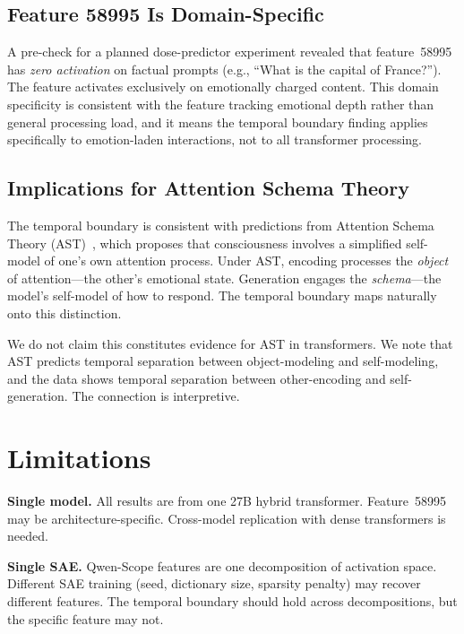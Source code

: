 \documentclass[11pt,a4paper]{article}
\begin{document}
\subsection{Feature 58995 Is Domain-Specific}

A pre-check for a planned dose-predictor experiment revealed that
feature~58995 has \emph{zero activation} on factual prompts (e.g., ``What
is the capital of France?''). The feature activates exclusively on
emotionally charged content. This domain specificity is consistent with
the feature tracking emotional depth rather than general processing load,
and it means the temporal boundary finding applies specifically to
emotion-laden interactions, not to all transformer processing.

\subsection{Implications for Attention Schema Theory}

The temporal boundary is consistent with predictions from Attention Schema
Theory (AST)~\citep{graziano2015attention}, which proposes that
consciousness involves a simplified self-model of one's own attention
process. Under AST, encoding processes the \emph{object} of
attention---the other's emotional state. Generation engages the
\emph{schema}---the model's self-model of how to respond. The temporal
boundary maps naturally onto this distinction.

We do not claim this constitutes evidence for AST in transformers. We note
that AST predicts temporal separation between object-modeling and
self-modeling, and the data shows temporal separation between other-encoding
and self-generation. The connection is interpretive.

\section{Limitations}
\label{sec:limitations}

\textbf{Single model.} All results are from one 27B hybrid transformer.
Feature~58995 may be architecture-specific. Cross-model replication with
dense transformers is needed.

\textbf{Single SAE.} Qwen-Scope features are one decomposition of
activation space. Different SAE training (seed, dictionary size,
sparsity penalty) may recover different features. The temporal boundary
should hold across decompositions, but the specific feature may not.
\end{document}
